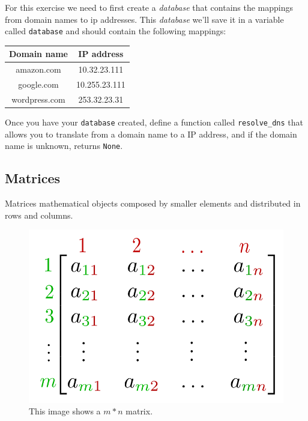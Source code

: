 \documentclass{tufte-handout}
\begin{document}
For this exercise we need to first create a \textit{database} that contains the
mappings from domain names to ip addresses.  This \textit{database} we'll save
it in a variable called \Verb|database| and should contain the following
mappings:

\begin{center}
  \begin{tabular}{||c c||}
    \hline
    \textbf{Domain name} & \textbf{IP address} \\ [0.5ex]
    \hline\hline
    amazon.com           & 10.32.23.111        \\
    \hline
    google.com           & 10.255.23.111       \\
    \hline
    wordpress.com        & 253.32.23.31        \\
    \hline
  \end{tabular}
\end{center}

Once you have your \Verb|database| created, define a function called
\Verb|resolve_dns| that allows you to translate from a domain name to a IP
address, and if the domain name is unknown, returns \Verb|None|.

\pagebreak

\subsection{Matrices}\label{sec:matrices}

Matrices mathematical objects composed by smaller elements and distributed in
rows and columns.

\begin{figure}
  \includegraphics{Matrix.png}
  \caption{This image shows a $m * n$ matrix.}
  \label{fig:matrix}
\end{figure}
\end{document}
